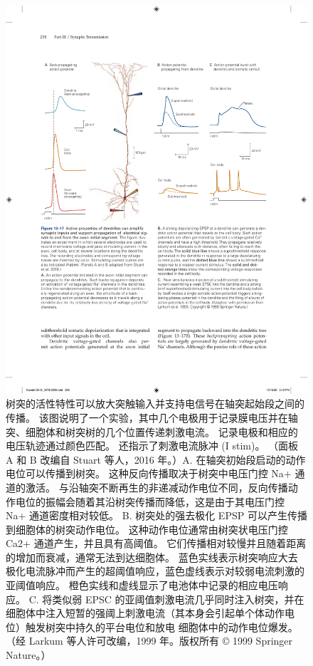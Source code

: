 \begin{figure}[htbp]
	\centering
	\includegraphics[width=0.95\linewidth]{chap13/fig_13_17}
	\caption{树突的活性特性可以放大突触输入并支持电信号在轴突起始段之间的传播。 该图说明了一个实验，其中几个电极用于记录膜电压并在轴突、细胞体和树突树的几个位置传递刺激电流。 记录电极和相应的电压轨迹通过颜色匹配。 还指示了刺激电流脉冲 (I stim)。 （面板 A 和 B 改编自 Stuart 等人，2016 年。）A. 在轴突初始段启动的动作电位可以传播到树突。 这种反向传播取决于树突中电压门控 Na+ 通道的激活。 与沿轴突不断再生的非递减动作电位不同，反向传播动作电位的振幅会随着其沿树突传播而降低，这是由于其电压门控 Na+ 通道密度相对较低。 B. 树突处的强去极化 EPSP 可以产生传播到细胞体的树突动作电位。 这种动作电位通常由树突状电压门控 Ca2+ 通道产生，并且具有高阈值。 它们传播相对较慢并且随着距离的增加而衰减，通常无法到达细胞体。 蓝色实线表示树突响应大去极化电流脉冲而产生的超阈值响应，蓝色虚线表示对较弱电流刺激的亚阈值响应。 橙色实线和虚线显示了电池体中记录的相应电压响应。 C. 将类似弱 EPSC 的亚阈值刺激电流几乎同时注入树突，并在细胞体中注入短暂的强阈上刺激电流（其本身会引起单个体动作电位）触发树突中持久的平台电位和放电 细胞体中的动作电位爆发。 （经 Larkum 等人许可改编，1999 年。版权所有 © 1999 Springer Nature。）}
	\label{fig:13_17}
\end{figure}


